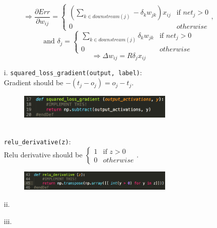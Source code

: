 \begin{equation*}
	\Rightarrow
	\frac{\partial Err}{\partial w_{ij}} = 
	\begin{cases}
			(\sum_{k \in downstream(j)}-\delta_k w_{jk}) x_{ij}& \mbox{if } net_{j} > 0 \\
			0 & otherwise 
	\end{cases},
\end{equation*}
\begin{equation*}
	 \mbox{and }\delta_j = 
	\begin{cases}
			\sum_{k \in downstream(j)}\delta_k w_{jk}  & \mbox{if } net_{j} > 0 \\
			0 & otherwise
	\end{cases}
\end{equation*}
\begin{equation*}
	\Rightarrow \Delta w_{ij} = R\delta_jx_{ij}
\end{equation*}
\clearpage

\item[(b)]
	\begin{itemize}  
	\item[i.]	
	{\tt squared\_loss\_gradient(output, label)}:\\
	Gradient should be $-(t_j-o_j)= o_j-t_j$.
	\begin{figure}[h]
  		\centering
    	\includegraphics[width=0.7\textwidth]{fig1.png}
	\end{figure}\\
	{\tt relu\_derivative(z)}:\\
	Relu derivative should be 
	$\begin{cases}
		1 & \mbox{if } z > 0 \\
		0 & otherwise
	\end{cases}$.
	\begin{figure}[h]
  		\centering
    	\includegraphics[width=0.7\textwidth]{fig2.png}
	\end{figure}
	\item[ii.]
	\item[iii.]

		
	\end{itemize}